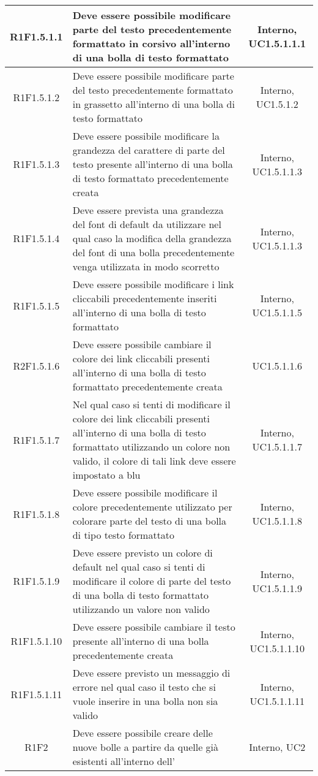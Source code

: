 \begin{longtable}{|c|>{\centering}m{7cm}|c|}
		\hline
		R1F1.5.1.1 & Deve essere possibile modificare parte del testo precedentemente formattato in corsivo all'interno di una bolla di testo formattato & Interno, UC1.5.1.1.1 \\
		\hline
		R1F1.5.1.2 & Deve essere possibile modificare parte del testo precedentemente formattato in grassetto all'interno di una bolla di testo formattato & Interno, UC1.5.1.2 \\
		\hline
		R1F1.5.1.3 & Deve essere possibile modificare la grandezza del carattere di parte del testo presente all'interno di una bolla di testo formattato precedentemente creata & Interno, UC1.5.1.1.3 \\
		\hline
		R1F1.5.1.4 & Deve essere prevista una grandezza del font di default da utilizzare nel qual caso la modifica della grandezza del font di una bolla precedentemente venga utilizzata in modo scorretto & Interno, UC1.5.1.1.3 \\
		\hline
		R1F1.5.1.5 & Deve essere possibile modificare i link cliccabili precedentemente inseriti all'interno di una bolla di testo formattato & Interno, UC1.5.1.1.5 \\
		\hline
		R2F1.5.1.6 & Deve essere possibile cambiare il colore dei link cliccabili presenti all'interno di una bolla di testo formattato precedentemente creata & UC1.5.1.1.6 \\
		\hline
		R1F1.5.1.7 & Nel qual caso si tenti di modificare il colore dei link cliccabili presenti all'interno di una bolla di testo formattato utilizzando un colore non valido, il colore di tali link deve essere impostato a blu & Interno, UC1.5.1.1.7 \\
		\hline
		R1F1.5.1.8 & Deve essere possibile modificare il colore precedentemente utilizzato per colorare parte del testo di una bolla di tipo testo formattato & Interno, UC1.5.1.1.8 \\
		\hline
		R1F1.5.1.9 & Deve essere previsto un colore di default nel qual caso si tenti di modificare il colore di parte del testo di una bolla di testo formattato utilizzando un valore non valido & Interno, UC1.5.1.1.9 \\
		\hline
		R1F1.5.1.10 & Deve essere possibile cambiare il testo presente all'interno di una bolla precedentemente creata & Interno, UC1.5.1.1.10 \\
		\hline
		R1F1.5.1.11 & Deve essere previsto un messaggio di errore nel qual caso il testo che si vuole inserire in una bolla non sia valido & Interno, UC1.5.1.1.11 \\
		\hline
			R1F2 & Deve essere possibile creare delle nuove bolle a partire da quelle già esistenti all'interno dell'\termine{SDK} & Interno, UC2 \\

\end{longtable}
